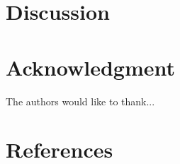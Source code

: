 \documentclass[conference]{IEEEtran}
\begin{document}
\section{Discussion}

\section*{Acknowledgment}

The authors would like to thank...

\section*{References}


\end{document}
